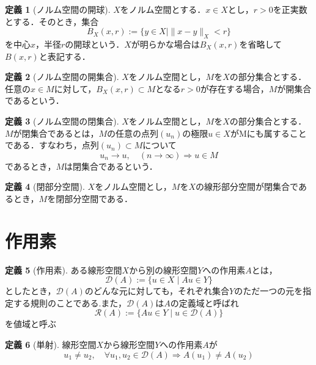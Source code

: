 \documentclass[11pt,a4paper,titlepage]{jsreport}
\theoremstyle{definition}
\newtheorem{dfn}{定義}
\begin{document}
\begin{dfn}[ノルム空間の開球]
  $X$をノルム空間とする．$x\in X$とし，$r>0$を正実数とする．そのとき，集合
  \begin{equation*}
    B_X(x,r):=\{y\in X \mid \|x-y\|_X<r\}
  \end{equation*}
  を中心$x$，半径$r$の開球という．$X$が明らかな場合は$B_X(x,r)$を省略して$B(x,r)$と表記する．
\end{dfn}

\begin{dfn}[ノルム空間の開集合]
  $X$をノルム空間とし，$M$を$X$の部分集合とする．任意の$x\in M$に対して，$B_X(x,r)\subset M$となる$r>0$が存在する場合，$M$が開集合であるという．
\end{dfn}

\begin{dfn}[ノルム空間の閉集合]
  $X$をノルム空間とし，$M$を$X$の部分集合とする．$M$が閉集合であるとは，$M$の任意の点列$(u_n)$の極限$u\in X$がMにも属することである．すなわち，点列$(u_n)\subset M$について
  \begin{equation*}
    u_n\rightarrow u, \quad \left(n\rightarrow \infty\right) \Rightarrow u\in M
  \end{equation*}
  であるとき，$M$は閉集合であるという．
\end{dfn}

\begin{dfn}[閉部分空間]
  $X$をノルム空間とし，$M$を$X$の線形部分空間が閉集合であるとき，$M$を閉部分空間である．
\end{dfn}

\section{作用素}
\begin{dfn}[作用素]
  ある線形空間$X$から別の線形空間$Y$への作用素$A$とは，
  \begin{equation*}
    \mathcal{D}(A) := \{u \in X \mid Au \in Y\}
  \end{equation*}
  としたとき，$\mathcal{D}(A)$のどんな元に対しても，それぞれ集合$Y$のただ一つの元を指定する規則のことである.また，$\mathcal{D}(A)$は$A$の定義域と呼ばれ
  \begin{equation*}
    \mathcal{R}(A) := \{Au \in Y \mid u\in\mathcal{D}(A)\}
  \end{equation*}
  を値域と呼ぶ
\end{dfn}

\begin{dfn}[単射]
  \label{dfn:単射}
  線形空間$X$から線形空間$Y$への作用素$A$が
  \begin{equation*}
    u_1 \neq u_2, \quad \forall u_1,u_2 \in \mathcal{D}(A) \Rightarrow A(u_1)\neq A(u_2)
  \end{equation*}
\end{dfn}
\end{document}
